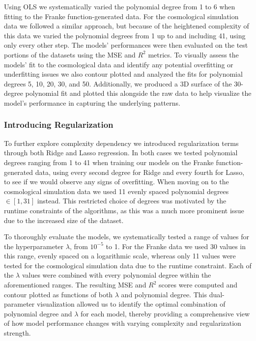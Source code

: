 \documentclass[aps,pra,english,notitlepage,reprint,nofootinbib]{revtex4-1}  %
\begin{document}
Using OLS we systematically varied the polynomial degree from 1 to 6 when fitting to the Franke function-generated data. For the cosmological simulation data we followed a similar approach, but because of the heightened complexity of this data we varied the polynomial degrees from 1 up to and including 41, using only every other step. The models' performances were then evaluated on the test portions of the datasets using the MSE and $R^2$ metrics. To visually assess the models' fit to the cosmological data and identify any potential overfitting or underfitting issues we also contour plotted and analyzed the fits for polynomial degrees 5, 10, 20, 30, and 50. Additionally, we produced a 3D surface of the 30-degree polynomial fit and plotted this alongside the raw data to help visualize the model's performance in capturing the underlying patterns.

\subsubsection{Introducing Regularization}
To further explore complexity dependency we introduced regularization terms through both Ridge and Lasso regression. In both cases we tested polynomial degrees ranging from 1 to 41 when training our models on the Franke function-generated data, using every second degree for Ridge and every fourth for Lasso, to see if we would observe any signs of overfitting. When moving on to the cosmological simulation data we used 11 evenly spaced polynomial degrees $\in[1,31]$ instead. This restricted choice of degrees was motivated by the runtime constraints of the algorithms, as this was a much more prominent issue due to the increased size of the dataset.

To thoroughly evaluate the models, we systematically tested a range of values for the hyperparameter $\lambda$, from $10^{-5}$ to 1. For the Franke data we used 30 values in this range, evenly spaced on a logarithmic scale, whereas only 11 values were tested for the cosmological simulation data due to the runtime constraint. Each of the $\lambda$ values were combined with every polynomial degree within the aforementioned ranges. The resulting MSE and $R^2$ scores were computed and contour plotted as functions of both $\lambda$ and polynomial degree. This dual-parameter visualization allowed us to identify the optimal combination of polynomial degree and $\lambda$ for each model, thereby providing a comprehensive view of how model performance changes with varying complexity and regularization strength.
\end{document}
